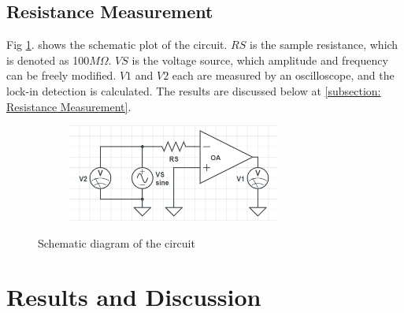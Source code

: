 \documentclass{article}
\begin{document}
\subsection{Resistance Measurement}
Fig \ref{fig: resistance measurement plot}. shows the schematic plot of the circuit.
$RS$ is the sample resistance, which is denoted as 100$M\Omega$.
$VS$ is the voltage source, which amplitude and frequency can be freely modified.
$V1$ and $V2$ each are measured by an oscilloscope, and the lock-in detection is calculated.
The results are discussed below at \ref{subsection: Resistance Measurement}.
\begin{figure}[H]
    \centering
    \begin{subfigure}[b]{7cm}
        \centering
        \includegraphics[width=7cm]{./figs/circuit2.png}
        \caption{}
    \end{subfigure}
    \hfill
    \caption{Schematic diagram of the circuit}
    \label{fig: resistance measurement plot}
\end{figure}

\section{Results and Discussion}
\end{document}
